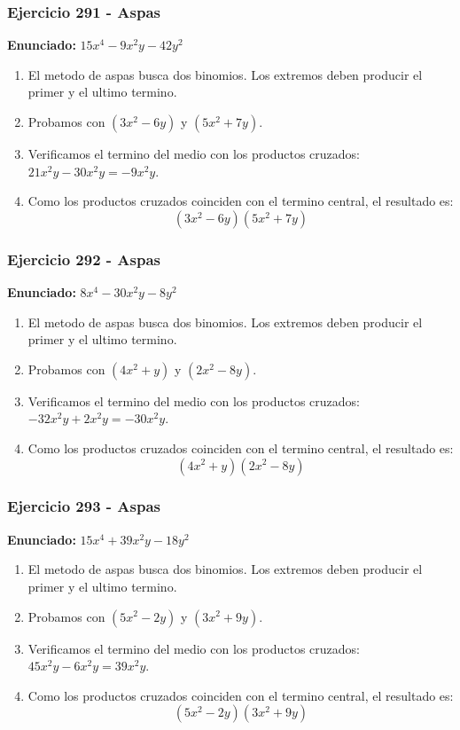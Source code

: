 \documentclass[11pt,a4paper]{article}
\begin{document}
\vspace{0.2cm}
\subsubsection*{Ejercicio 291 - Aspas}
\textbf{Enunciado:} $ 15 x^{4} - 9 x^{2} y - 42 y^{2} $\par
\begin{enumerate}[leftmargin=2em]
\item El metodo de aspas busca dos binomios. Los extremos deben producir el primer y el ultimo termino.
\item Probamos con \((3 x^{2} - 6 y)\) y \((5 x^{2} + 7 y)\).
\item Verificamos el termino del medio con los productos cruzados: \(21 x^{2} y- 30 x^{2} y=- 9 x^{2} y\).
\item Como los productos cruzados coinciden con el termino central, el resultado es: \[\boxed{\left(3 x^{2} - 6 y\right)\left(5 x^{2} + 7 y\right)}\]
\end{enumerate}

\vspace{0.2cm}
\subsubsection*{Ejercicio 292 - Aspas}
\textbf{Enunciado:} $ 8 x^{4} - 30 x^{2} y - 8 y^{2} $\par
\begin{enumerate}[leftmargin=2em]
\item El metodo de aspas busca dos binomios. Los extremos deben producir el primer y el ultimo termino.
\item Probamos con \((4 x^{2} + y)\) y \((2 x^{2} - 8 y)\).
\item Verificamos el termino del medio con los productos cruzados: \(- 32 x^{2} y+2 x^{2} y=- 30 x^{2} y\).
\item Como los productos cruzados coinciden con el termino central, el resultado es: \[\boxed{\left(4 x^{2} + y\right)\left(2 x^{2} - 8 y\right)}\]
\end{enumerate}

\vspace{0.2cm}
\subsubsection*{Ejercicio 293 - Aspas}
\textbf{Enunciado:} $ 15 x^{4} + 39 x^{2} y - 18 y^{2} $\par
\begin{enumerate}[leftmargin=2em]
\item El metodo de aspas busca dos binomios. Los extremos deben producir el primer y el ultimo termino.
\item Probamos con \((5 x^{2} - 2 y)\) y \((3 x^{2} + 9 y)\).
\item Verificamos el termino del medio con los productos cruzados: \(45 x^{2} y- 6 x^{2} y=39 x^{2} y\).
\item Como los productos cruzados coinciden con el termino central, el resultado es: \[\boxed{\left(5 x^{2} - 2 y\right)\left(3 x^{2} + 9 y\right)}\]
\end{enumerate}
\end{document}
